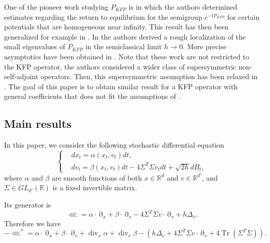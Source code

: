 \documentclass[12pt]{amsart}
\newcommand{\R}{\mathbb R}
\newcommand{\Tr}{{\operatorname{Tr}}}
\renewcommand{\div}{\operatorname{div}}
\numberwithin{equation}{section}
\numberwithin{figure}{section}
\DeclareMathOperator{\p}{\partial}
\begin{document}
One of the pioneer work studying $P_{KFP}$ is \cite{HeNi04} in which the authors determined estimates regarding the return to equilibrium for the semigroup $e^{-tP_{KFP}}$ for certain potentials that are homogeneous near infinity. This result has then been generalized for example in \cite{Li09,Be22}. In \cite{HeSjSt05} the authors derived a rough localization of the small eigenvalues of $P_{KFP}$ in the semiclassical limit $h\to0$. More precise asymptotics have been obtained in \cite{HeHiSj08-2,HeHiSj11_01}. Note that these work are not restricted to the KFP operator, the authors considered a wider class of supersymmetric non-self-adjoint operators. Then, this supersymmetric assumption has been relaxed in \cite{BoLePMi22}. The goal of this paper is to obtain similar result for a KFP operator with general coefficients that does not fit the assumptions of \cite{HeHiSj08-2,HeHiSj11_01,BoLePMi22}.


\subsection{Main results}
In this paper, we consider the following stochastic differential equation
\begin{equation}\label{eq:SDE}
\left\{
\begin{aligned}
&dx_t = \alpha(x_t,v_t)dt,\\
&dv_t = \beta(x_t,v_t)dt - 4\Sigma^T\Sigma v_tdt + \sqrt{2h}dB_t,
\end{aligned}
\right.
\end{equation}
where $\alpha$ and $\beta$ are smooth functions of both $x\in\R^d$ %
and $v\in\R^{d'}$, %
and $\Sigma\in GL_{d'}(\R)$ is a fixed invertible matrix.

Its generator is
\begin{equation*}
\lll = \alpha\cdot\p_x + \beta\cdot\p_v - 4\Sigma^T\Sigma v\cdot\p_v + h\Delta_v.
\end{equation*}
Therefore we %
have
\begin{equation*}
-\lll^* = \alpha\cdot\p_x + \beta\cdot\p_v + \div_x\alpha + \div_v\beta - (h\Delta_v + 4\Sigma^T\Sigma v\cdot\p_v + 4\Tr(\Sigma^T\Sigma)).
\end{equation*}
\end{document}
